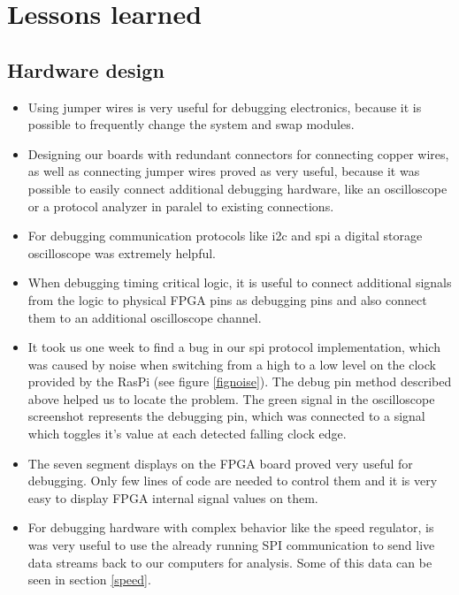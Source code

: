 \documentclass[a4paper
               ,10pt
               ,DIV=10 %
               ,BCOR=0.3cm
               ,pagesize %
               ,headings=small
               ,bibtotoc
               ]
               {scrartcl}
\begin{document}
\section{Lessons learned}
\subsection{Hardware design}
\begin{itemize}
  \item Using jumper wires is very useful for debugging electronics, because it is possible to frequently change the system and swap modules.
  \item Designing our boards with redundant connectors for connecting copper wires, as well as connecting jumper wires proved as very useful, because it was possible to easily connect additional debugging hardware, like an oscilloscope or a protocol analyzer in paralel to existing connections.
  \item For debugging communication protocols like i2c and spi a digital storage oscilloscope was extremely helpful.
  \item When debugging timing critical logic, it is useful to connect additional signals from the logic to physical FPGA pins as debugging pins and also connect them to an additional oscilloscope channel.
  \item It took us one week to find a bug in our spi protocol implementation, which was caused by noise when switching from a high to a low level on the clock provided by the RasPi (see figure \ref{fignoise}). The debug pin method described above helped us to locate the problem. The green signal in the oscilloscope screenshot represents the debugging pin, which was connected to a signal which toggles it's value at each detected falling clock edge.

	\item The seven segment displays on the FPGA board proved very useful for debugging. Only few lines of code are needed to control them and it is very easy to display FPGA internal signal values on them.
  \item For debugging hardware with complex behavior like the speed regulator, is was very useful to use the already running SPI communication to send live data streams back to our computers for analysis. Some of this data can be seen in section \ref{speed}.
\end{itemize}
\end{document}
